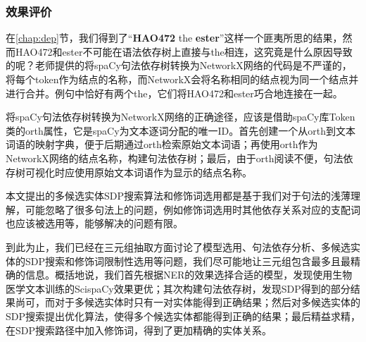 \documentclass[twocolumn]{article}
\begin{document}
\subsubsection{效果评价\label{chap:dep_eva}}
在\ref{chap:dep}节，我们得到了“\textbf{HAO472} the \textbf{ester}”这样一个匪夷所思的结果，然而HAO472和ester不可能在语法依存树上直接与the相连，这究竟是什么原因导致的呢？老师提供的将spaCy句法依存树转换为NetworkX网络的代码是不严谨的，将每个token作为结点的名称，而NetworkX会将名称相同的结点视为同一个结点并进行合并。例句中恰好有两个the，它们将HAO472和ester巧合地连接在一起。\par
将spaCy句法依存树转换为NetworkX网络的正确途径，应该是借助spaCy库Token类的orth属性，它是spaCy为文本逐词分配的唯一ID。首先创建一个从orth到文本词语的映射字典，便于后期通过orth检索原始文本词语；再使用orth作为NetworkX网络的结点名称，构建句法依存树；最后，由于orth阅读不便，句法依存树可视化时应使用原始文本词语作为显示的结点名称。\par
本文提出的多候选实体SDP搜索算法和修饰词选用都是基于我们对于句法的浅薄理解，可能忽略了很多句法上的问题，例如修饰词选用时其他依存关系对应的支配词也应该被选用等，能够解决的问题有限。\par
到此为止，我们已经在三元组抽取方面讨论了模型选用、句法依存分析、多候选实体的SDP搜索和修饰词限制性选用等问题，我们尽可能地让三元组包含最多且最精确的信息。概括地说，我们首先根据NER的效果选择合适的模型，发现使用生物医学文本训练的ScispaCy效果更优；其次构建句法依存树，发现SDP得到的部分结果尚可，而对于多候选实体时只有一对实体能得到正确结果；然后对多候选实体的SDP搜索提出优化算法，使得多个候选实体都能得到正确的结果；最后精益求精，在SDP搜索路径中加入修饰词，得到了更加精确的实体关系。\par
\end{document}
